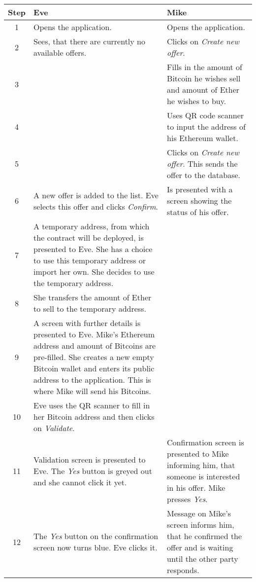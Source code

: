 \begin{table}[htp]
    \centering
    \begin{tabularx}{\textwidth}{|c|X|X|}
        \hline
        \textbf{Step}&\textbf{Eve}&\textbf{Mike}\\
        \hline
        1&Opens the application.&Opens the application.\\
        \hline
        2&Sees, that there are currently no available offers.&Clicks on \textit{Create new offer}.\\
        \hline
        3&&Fills in the amount of Bitcoin he wishes sell and amount of Ether he wishes to buy.\\
        \hline
        4&&Uses QR code scanner to input the address of his Ethereum wallet.\\
        \hline
        5&&Clicks on \textit{Create new offer}. This sends the offer to the database.\\
        \hline
        6&A new offer is added to the list. Eve selects this offer and clicks \textit{Confirm}.&Is presented with a screen showing the status of his offer.\\
        \hline
        7&A temporary address, from which the contract will be deployed, is presented to Eve. She has a choice to use this temporary address or import her own. She decides to use the temporary address.&\\
        \hline
        8&She transfers the amount of Ether to sell to the temporary address.&\\
        \hline
        9&A screen with further details is presented to Eve. Mike's Ethereum address and amount of Bitcoins are pre-filled. She creates a new empty Bitcoin wallet and enters its public address to the application. This is where Mike will send his Bitcoins.&\\
        \hline
        10&Eve uses the QR scanner to fill in her Bitcoin address and then clicks on \textit{Validate}.&\\
        \hline
        11&Validation screen is presented to Eve. The \textit{Yes} button is greyed out and she cannot click it yet.&Confirmation screen is presented to Mike informing him, that someone is interested in his offer. Mike presses \textit{Yes}.\\
        \hline
        12&The \textit{Yes} button on the confirmation screen now turns blue. Eve clicks it.&Message on Mike's screen informs him, that he confirmed the offer and is waiting until the other party responds.\\

\end{tabularx}
\end{table}
